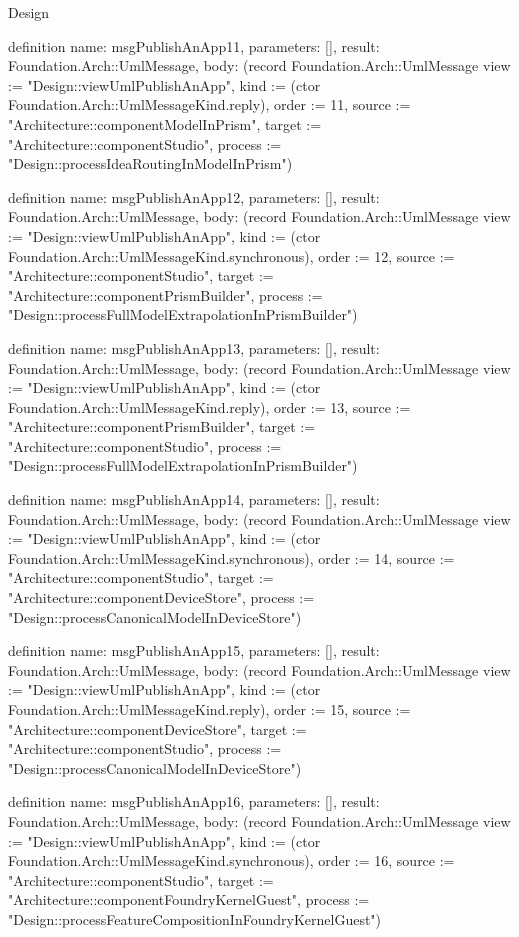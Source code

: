 \begin{lexlean}{Design}
\begin{semanticmodule}
definition{
  name: msgPublishAnApp11,
  parameters: [],
  result: Foundation.Arch::UmlMessage,
  body: (record Foundation.Arch::UmlMessage {view := "Design::viewUmlPublishAnApp", kind := (ctor Foundation.Arch::UmlMessageKind.reply), order := 11, source := "Architecture::componentModelInPrism", target := "Architecture::componentStudio", process := "Design::processIdeaRoutingInModelInPrism"})
}

definition{
  name: msgPublishAnApp12,
  parameters: [],
  result: Foundation.Arch::UmlMessage,
  body: (record Foundation.Arch::UmlMessage {view := "Design::viewUmlPublishAnApp", kind := (ctor Foundation.Arch::UmlMessageKind.synchronous), order := 12, source := "Architecture::componentStudio", target := "Architecture::componentPrismBuilder", process := "Design::processFullModelExtrapolationInPrismBuilder"})
}

definition{
  name: msgPublishAnApp13,
  parameters: [],
  result: Foundation.Arch::UmlMessage,
  body: (record Foundation.Arch::UmlMessage {view := "Design::viewUmlPublishAnApp", kind := (ctor Foundation.Arch::UmlMessageKind.reply), order := 13, source := "Architecture::componentPrismBuilder", target := "Architecture::componentStudio", process := "Design::processFullModelExtrapolationInPrismBuilder"})
}

definition{
  name: msgPublishAnApp14,
  parameters: [],
  result: Foundation.Arch::UmlMessage,
  body: (record Foundation.Arch::UmlMessage {view := "Design::viewUmlPublishAnApp", kind := (ctor Foundation.Arch::UmlMessageKind.synchronous), order := 14, source := "Architecture::componentStudio", target := "Architecture::componentDeviceStore", process := "Design::processCanonicalModelInDeviceStore"})
}

definition{
  name: msgPublishAnApp15,
  parameters: [],
  result: Foundation.Arch::UmlMessage,
  body: (record Foundation.Arch::UmlMessage {view := "Design::viewUmlPublishAnApp", kind := (ctor Foundation.Arch::UmlMessageKind.reply), order := 15, source := "Architecture::componentDeviceStore", target := "Architecture::componentStudio", process := "Design::processCanonicalModelInDeviceStore"})
}

definition{
  name: msgPublishAnApp16,
  parameters: [],
  result: Foundation.Arch::UmlMessage,
  body: (record Foundation.Arch::UmlMessage {view := "Design::viewUmlPublishAnApp", kind := (ctor Foundation.Arch::UmlMessageKind.synchronous), order := 16, source := "Architecture::componentStudio", target := "Architecture::componentFoundryKernelGuest", process := "Design::processFeatureCompositionInFoundryKernelGuest"})
}


\end{semanticmodule}
\end{lexlean}
